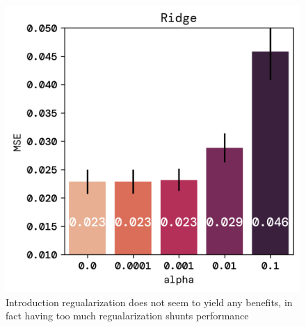 \documentclass[twoside,11pt]{report}
\begin{document}
\begin{figure}[!ht]
\begin{minipage}[t]{0.5\textwidth - 1mm}
            \begin{center}
                \includegraphics[width=\textwidth]{../runsAndFigures/MSE_alpha.png}
            \end{center}
            \caption{Introduction regualarization does not seem to yield any benefits, in fact
            having too much regualarization shunts performance}\label{fig:MSE_aplha}
        \end{minipage}
    \end{figure}
\end{document}

